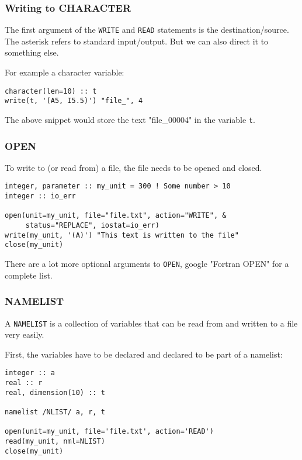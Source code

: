 \begin{frame}[fragile]
  \frametitle{Writing to CHARACTER}

  The first argument of the \texttt{WRITE} and \texttt{READ} statements is the 
  destination/source.
  The asterisk refers to standard input/output.
  But we can also direct it to something else.

  For example a character variable:

  \begin{lstlisting}
character(len=10) :: t
write(t, '(A5, I5.5)') "file_", 4
  \end{lstlisting}

  The above snippet would store the text "file\_00004" in the variable \texttt{t}.

\end{frame}

\begin{frame}[fragile]
  \frametitle{OPEN}

  To write to (or read from) a file, the file needs to be opened and closed.

  \begin{lstlisting}
integer, parameter :: my_unit = 300 ! Some number > 10
integer :: io_err

open(unit=my_unit, file="file.txt", action="WRITE", &
     status="REPLACE", iostat=io_err)
write(my_unit, '(A)') "This text is written to the file"
close(my_unit)
  \end{lstlisting}

  There are a lot more optional arguments to \texttt{OPEN}, google "Fortran OPEN" for a complete list.

\end{frame}

\begin{frame}[fragile]
  \frametitle{NAMELIST}

  A \texttt{NAMELIST} is a collection of variables that can be read from and
  written to a file very easily.

  First, the variables have to be declared and declared to be part of a namelist:

  \begin{lstlisting}
integer :: a
real :: r
real, dimension(10) :: t

namelist /NLIST/ a, r, t

open(unit=my_unit, file='file.txt', action='READ')
read(my_unit, nml=NLIST)
close(my_unit)
  \end{lstlisting}

\end{frame}

